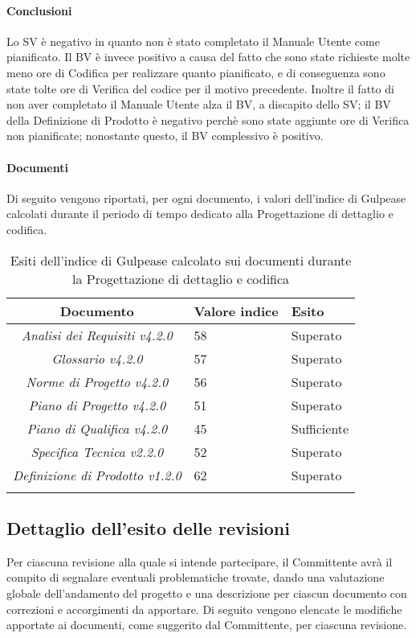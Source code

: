 \paragraph{Conclusioni}
Lo SV è negativo in quanto non è stato completato il Manuale Utente come pianificato.
Il BV è invece positivo a causa del fatto che sono state richieste molte meno ore di Codifica per realizzare quanto pianificato, e di conseguenza sono state tolte ore di Verifica del codice per il motivo precedente.
Inoltre il fatto di non aver completato il Manuale Utente alza il BV, a discapito dello SV; il BV della Definizione di Prodotto è negativo perchè sono state aggiunte ore di Verifica non pianificate; nonostante questo, il BV complessivo è positivo.


\paragraph{Documenti}
Di seguito vengono riportati, per ogni documento, i valori dell'indice di Gulpease calcolati durante il periodo di tempo dedicato alla Progettazione di dettaglio e codifica.

\begin{longtable}{|c|p{3cm}|p{3cm}|}
\toprule
\textbf{Documento} & \textbf{Valore indice} & \textbf{Esito} \\


\midrule
\emph{Analisi dei Requisiti v4.2.0} & 58 & Superato \\
\midrule
\emph{Glossario v4.2.0} & 57 & Superato \\
\midrule
\emph{Norme di Progetto v4.2.0} & 56 & Superato \\
\midrule
\emph{Piano di Progetto v4.2.0} & 51 & Superato\\
\midrule
\emph{Piano di Qualifica v4.2.0} & 45 & Sufficiente \\
\midrule
\emph{Specifica Tecnica v2.2.0} & 52 & Superato\\
\midrule
\emph{Definizione di Prodotto v1.2.0} & 62 & Superato\\
\bottomrule
\caption{Esiti dell'indice di Gulpease calcolato sui documenti durante la Progettazione di dettaglio e codifica}
\label{tab:changelog}
\end{longtable}

\subsection{Dettaglio dell'esito delle revisioni}
Per ciascuna revisione alla quale si intende partecipare, il Committente avrà il compito di segnalare eventuali problematiche trovate, dando una valutazione globale dell'andamento del progetto e una descrizione per ciascun documento con correzioni e accorgimenti da apportare.
Di seguito vengono elencate le modifiche apportate ai documenti, come suggerito dal Committente, per ciascuna revisione.
